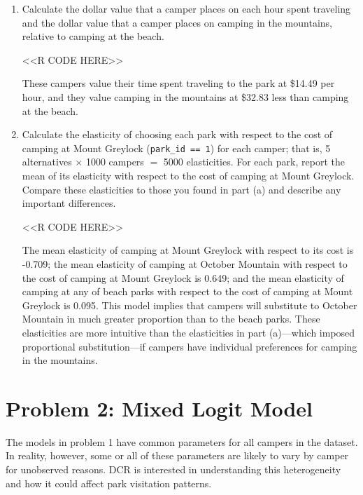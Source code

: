 \documentclass[11pt,letterpaper]{article}
\begin{document}
\begin{enumerate}[label=\alph*., leftmargin=*]
\begin{enumerate}[label=\roman*.]
		\item Calculate the dollar value that a camper places on each hour spent traveling and the dollar value that a camper places on camping in the mountains, relative to camping at the beach.

		<<R CODE HERE>>

		These campers value their time spent traveling to the park at \$14.49 per hour, and they value camping in the mountains at \$32.83 less than camping at the beach.

		\item Calculate the elasticity of choosing each park with respect to the cost of camping at Mount Greylock (\texttt{park\_id == 1}) for each camper; that is, 5 alternatives $\times$ 1000 campers $=$ 5000 elasticities. For each park, report the mean of its elasticity with respect to the cost of camping at Mount Greylock. Compare these elasticities to those you found in part (a) and describe any important differences.

		<<R CODE HERE>>

		The mean elasticity of camping at Mount Greylock with respect to its cost is -0.709; the mean elasticity of camping at October Mountain with respect to the cost of camping at Mount Greylock is 0.649; and the mean elasticity of camping at any of beach parks with respect to the cost of camping at Mount Greylock is 0.095. This model implies that campers will substitute to October Mountain in much greater proportion than to the beach parks. These elasticities are more intuitive than the elasticities in part (a)---which imposed proportional substitution---if campers have individual preferences for camping in the mountains.
	\end{enumerate}
\end{enumerate}

\section*{Problem 2: Mixed Logit Model}

The models in problem 1 have common parameters for all campers in the dataset. In reality, however, some or all of these parameters are likely to vary by camper for unobserved reasons. DCR is interested in understanding this heterogeneity and how it could affect park visitation patterns.
\end{document}
